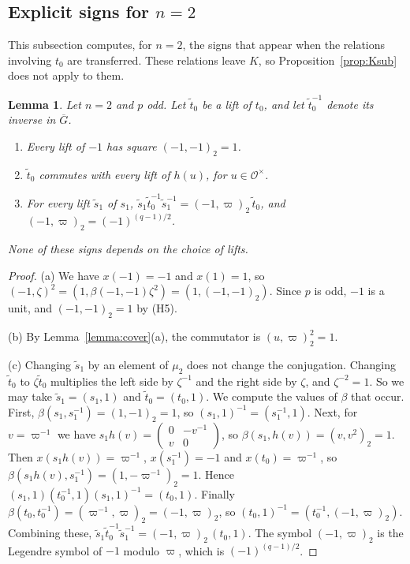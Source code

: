 \documentclass[12pt,letterpaper]{amsart}
\numberwithin{equation}{section}
\newtheorem{lemma}[theorem]{Lemma}
\theoremstyle{definition}
\theoremstyle{remark}
\newcommand{\cO}{\mathcal{O}}
\newcommand{\Gbar}{\overline{G}}
\newcommand{\mat}[4]{\begin{pmatrix} #1 & #2\\ #3 & #4\end{pmatrix}}
\begin{document}
\subsection{Explicit signs for \texorpdfstring{$n=2$}{n=2}}
This subsection computes, for $n=2$, the signs that appear when the
relations involving $t_0$ are transferred. These relations leave $K$,
so Proposition~\ref{prop:Ksub} does not apply to them.

\begin{lemma}
\label{lemma:signs}
Let $n=2$ and $p$ odd. Let $\tilde t_0$ be a lift of $t_0$, and let
$\tilde t_0^{-1}$ denote its inverse in $\Gbar$.
\begin{enumerate}[leftmargin=2em,label=(\alph*)]
\item Every lift of $-1$ has square $(-1,-1)_2=1$.
\item $\tilde t_0$ commutes with every lift of $h(u)$, for
$u\in\cO^\times$.
\item For every lift $\tilde s_1$ of $s_1$,
$\tilde s_1\tilde t_0^{-1}\tilde s_1^{-1}=(-1,\varpi)_2\,\tilde t_0$,
and $(-1,\varpi)_2=(-1)^{(q-1)/2}$.
\end{enumerate}
None of these signs depends on the choice of lifts.
\end{lemma}

\begin{proof}
(a) We have $x(-1)=-1$ and $x(1)=1$, so
$(-1,\zeta)^2=(1,\beta(-1,-1)\zeta^2)=(1,(-1,-1)_2)$. Since $p$ is odd,
$-1$ is a unit, and $(-1,-1)_2=1$ by (H5).

(b) By Lemma~\ref{lemma:cover}(a), the commutator is
$(u,\varpi)_2^2=1$.

(c) Changing $\tilde s_1$ by an element of $\mu_2$ does not change the
conjugation. Changing $\tilde t_0$ to $\zeta\tilde t_0$ multiplies the
left side by $\zeta^{-1}$ and the right side by $\zeta$, and
$\zeta^{-2}=1$. So we may take $\tilde s_1=(s_1,1)$ and
$\tilde t_0=(t_0,1)$. We compute the values of $\beta$ that occur.
First, $\beta(s_1,s_1^{-1})=(1,-1)_2=1$, so $(s_1,1)^{-1}=(s_1^{-1},1)$.
Next, for $v=\varpi^{-1}$ we have $s_1h(v)=\mat 0{-v^{-1}}v0$, so
$\beta(s_1,h(v))=(v,v^2)_2=1$. Then $x(s_1h(v))=\varpi^{-1}$,
$x(s_1^{-1})=-1$ and $x(t_0)=\varpi^{-1}$, so
$\beta(s_1h(v),s_1^{-1})=(1,-\varpi^{-1})_2=1$. Hence
$(s_1,1)(t_0^{-1},1)(s_1,1)^{-1}=(t_0,1)$. Finally
$\beta(t_0,t_0^{-1})=(\varpi^{-1},\varpi)_2=(-1,\varpi)_2$, so
$(t_0,1)^{-1}=(t_0^{-1},(-1,\varpi)_2)$. Combining these,
$\tilde s_1\tilde t_0^{-1}\tilde s_1^{-1}=(-1,\varpi)_2\,(t_0,1)$. The
symbol $(-1,\varpi)_2$ is the Legendre symbol of $-1$ modulo $\varpi$,
which is $(-1)^{(q-1)/2}$.
\end{proof}
\end{document}
